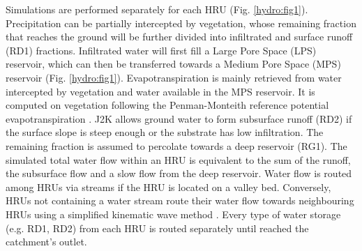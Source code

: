 Simulations are performed separately for each HRU (Fig. \ref{hydro:fig1}). Precipitation can be partially intercepted by vegetation, whose remaining fraction that reaches the ground will be further divided into infiltrated and surface runoff (RD1) fractions. Infiltrated water will first fill a Large Pore Space (LPS) reservoir, which can then be transferred towards a Medium Pore Space (MPS) reservoir (Fig. \ref{hydro:fig1}). Evapotranspiration is mainly retrieved from water intercepted by vegetation and water available in the MPS reservoir. It is computed on vegetation following the Penman-Monteith reference potential evapotranspiration \citep{howell_penman-monteith_2004}. J2K allows ground water to form subsurface runoff (RD2) if the surface slope is steep enough or the substrate has low infiltration. The remaining fraction is assumed to percolate towards a deep reservoir (RG1). The simulated total water flow within an HRU is equivalent to the sum of the runoff, the subsurface flow and a slow flow from the deep reservoir. Water flow is routed among HRUs via streams if the HRU is located on a valley bed. Conversely, HRUs not containing a water stream route their water flow towards neighbouring HRUs using a simplified kinematic wave method \citep{chen_surface_1970}. Every type of water storage (e.g. RD1, RD2) from each HRU is routed separately until reached the catchment's outlet. 

